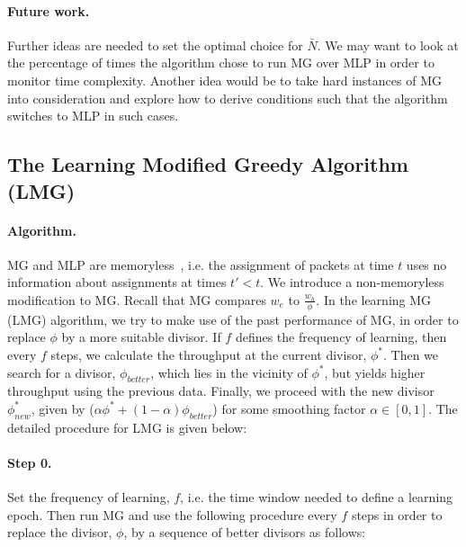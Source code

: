 \documentclass[oribibl]{llncs}
\begin{document}
\paragraph{Future work.}  Further ideas are needed
to set the optimal choice for $\bar{N}$. We may want to look at the
percentage of times the algorithm chose to run MG over MLP in order to
monitor time complexity. Another idea would be to take hard instances
of MG into consideration and explore how to derive conditions such
that the algorithm switches to MLP in such cases.

\subsection{The Learning Modified Greedy Algorithm (LMG)}
\paragraph{Algorithm.} MG and MLP are memoryless~\cite{jez12},
i.e. the assignment of packets at time $t$ uses no information about
assignments at times $t' < t$.  
We introduce a non-memoryless modification to MG.
Recall that MG
compares $w_e$ to $\frac{w_h}{\phi}$. In the
learning MG (LMG) algorithm, we try to make use of the past
performance of MG, in order to replace $\phi$ by a more suitable
divisor. If $f$ defines the frequency of learning, then every $f$ steps, we calculate the throughput at the current divisor, $\phi^*$. Then we search for a divisor, $\phi_{better}$, which lies in the vicinity of $\phi^*$, but yields higher throughput using the previous data. Finally, we proceed with the new divisor $\phi^{*}_{new}$, given by ($\alpha \phi^{*} + (1-\alpha) \phi_{better}$)  for some smoothing factor $\alpha \in [0,1]$. The detailed procedure for LMG is given below: 

\paragraph{Step 0.} Set the frequency of learning, $f$, i.e. the time window needed to define a learning epoch. Then run MG and use the following procedure every $f$ steps in order to replace the divisor, $\phi$, by a sequence of better divisors as follows:
\end{document}
